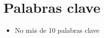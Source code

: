 %
%
%
%
%

\chapter{Palabras clave}

\begin{itemize}
    \item No más de 10 palabras clave
\end{itemize}

\endinput
